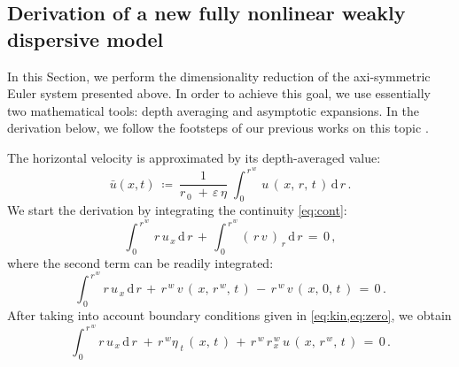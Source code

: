 \documentclass[alpha-refs, 12pt]{wiley-article}
\newcommand{\ud}{\mathrm{d}}
\newcommand{\eps}{\varepsilon}
\begin{document}
\subsection{Derivation of a new fully nonlinear weakly dispersive model}

In this Section, we perform the dimensionality reduction of the axi-symmetric Euler system presented above. In order to achieve this goal, we use essentially two mathematical tools: depth averaging and asymptotic expansions. In the derivation below, we follow the footsteps of our previous works on this topic \cite{Dutykh2011a, Clamond2015c, Khakimzyanov2019, Clamond2024}.

The horizontal velocity is approximated by its depth-averaged value:
\begin{equation}\label{eq:avg}
  \bar{u}(x,t)\ \coloneqq\ \frac{1}{r_{\,0}\;+\,\eps\,\eta}\;\displaystyle \int_{\,0}^{\,r^{\,w}}\,u\,(\,x,\,r,\,t\,)\,\ud\,r\,.
\end{equation}
We start the derivation by integrating the continuity \cref{eq:cont}:
\begin{equation*}
  \int_{\,0}^{\,r^{\,w}}\,r\,u_{\,x}\,\ud\,r \,+\, \int_{\,0}^{\,r^{\,w}}(\,r\,v\,)_{\,r}\,\ud\,r\,=\,0\,,
\end{equation*}
where the second term can be readily integrated:
\begin{equation*}
  \int_{\,0}^{\,r^{\,w}}r\,u_{\,x}\,\ud\,r\,+\, r^{\,w}\,v\,(\,x,\,r^{\,w},\,t\,)\,-\,r^{\,w}\,v\,(\,x,\,0,\,t\,)\,=\,0\,.
\end{equation*}
After taking into account boundary conditions given in \cref{eq:kin,eq:zero}, we obtain
\begin{equation}\label{eq:contint}
  \int_{\,0}^{\,r^{\,w}}r\,u_{\,x}\,\ud\,r\;+\,r^{\,w} \eta_{\;t}\,(\,x,\,t\,)\,+\,r^{\,w}\,r_{\,x}^{\,w}\,u\,(\,x,\,r^{\,w},\,t\,)\,=\,0\,.
\end{equation}
\end{document}
